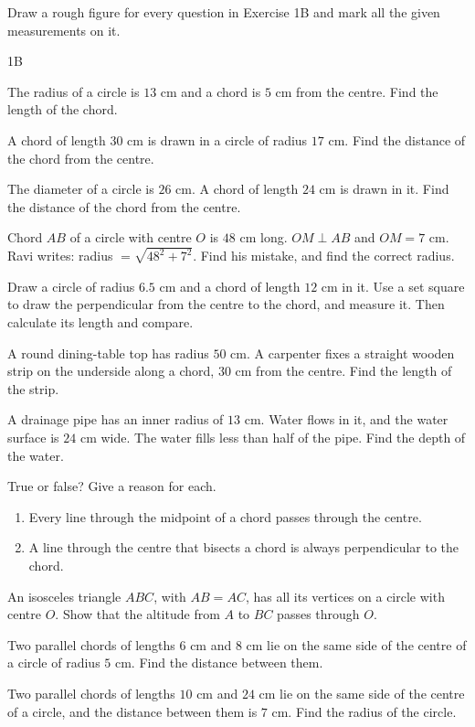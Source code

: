 Draw a rough figure for every question in Exercise 1B and mark all the given measurements on it.
\begin{exercise}{1B}
\item The radius of a circle is $13$ cm and a chord is $5$ cm from the centre. Find the length of the chord.
\item A chord of length $30$ cm is drawn in a circle of radius $17$ cm. Find the distance of the chord from the centre.
\item The diameter of a circle is $26$ cm. A chord of length $24$ cm is drawn in it. Find the distance of the chord from the centre.
\item Chord $AB$ of a circle with centre $O$ is $48$ cm long. $OM\perp AB$ and $OM=7$ cm. Ravi writes: radius $=\sqrt{48^2+7^2}$. Find his mistake, and find the correct radius.
\item Draw a circle of radius $6.5$ cm and a chord of length $12$ cm in it. Use a set square to draw the perpendicular from the centre to the chord, and measure it. Then calculate its length and compare.
\item A round dining-table top has radius $50$ cm. A carpenter fixes a straight wooden strip on the underside along a chord, $30$ cm from the centre. Find the length of the strip.
\item A drainage pipe has an inner radius of $13$ cm. Water flows in it, and the water surface is $24$ cm wide. The water fills less than half of the pipe. Find the depth of the water.
\item True or false? Give a reason for each.
  \begin{enumerate}[label=(\alph*),itemsep=1pt]
    \item Every line through the midpoint of a chord passes through the centre.
    \item A line through the centre that bisects a chord is always perpendicular to the chord.
  \end{enumerate}
\item An isosceles triangle $ABC$, with $AB=AC$, has all its vertices on a circle with centre $O$. Show that the altitude from $A$ to $BC$ passes through $O$.
\item Two parallel chords of lengths $6$ cm and $8$ cm lie on the same side of the centre of a circle of radius $5$ cm. Find the distance between them.
\item Two parallel chords of lengths $10$ cm and $24$ cm lie on the same side of the centre of a circle, and the distance between them is $7$ cm. Find the radius of the circle.
\end{exercise}

